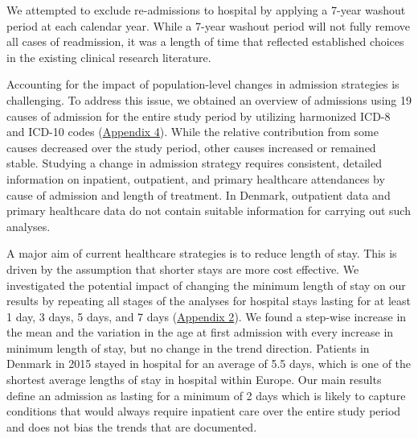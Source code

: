 We attempted to exclude re-admissions to hospital by applying a 7-year washout 
period at each calendar year. While a 7-year washout period will not fully remove 
all cases of readmission, it was a length of time that reflected established choices 
in the existing clinical research literature.\citep{modig2017estimating,roberts2015revisiting}

Accounting for the impact of population-level changes in admission strategies is 
challenging. To address this issue, we obtained an overview of admissions using 
19 causes of admission for the entire study period by utilizing harmonized ICD-8 
and ICD-10 codes (\hyperref[ch4:app4]{Appendix 4}). While the relative contribution from some causes 
decreased over the study period, other causes increased or remained stable. 
Studying a change in admission strategy requires consistent, detailed information 
on inpatient, outpatient, and primary healthcare attendances by cause of admission 
and length of treatment. In Denmark, outpatient data and primary healthcare data 
do not contain suitable information for carrying out such analyses.

A major aim of current healthcare strategies is to reduce length of stay. This 
is driven by the assumption that shorter stays are more cost effective. We investigated 
the potential impact of changing the minimum length of stay on our results by repeating 
all stages of the analyses for hospital stays lasting for at least 1 day, 3 days, 
5 days, and 7 days (\hyperref[ch4:app2]{Appendix 2}). We found a step-wise increase 
in the mean and the variation in the age at first admission with every increase in minimum length of 
stay, but no change in the trend direction. Patients in Denmark in 2015 stayed in 
hospital for an average of 5.5 days, which is one of the shortest average lengths 
of stay in hospital within Europe.\citep{oecd2017indicators} Our main results define 
an admission as lasting for a minimum of 2 days which is likely to capture conditions 
that would always require inpatient care over the entire study period and does not 
bias the trends that are documented.\\


